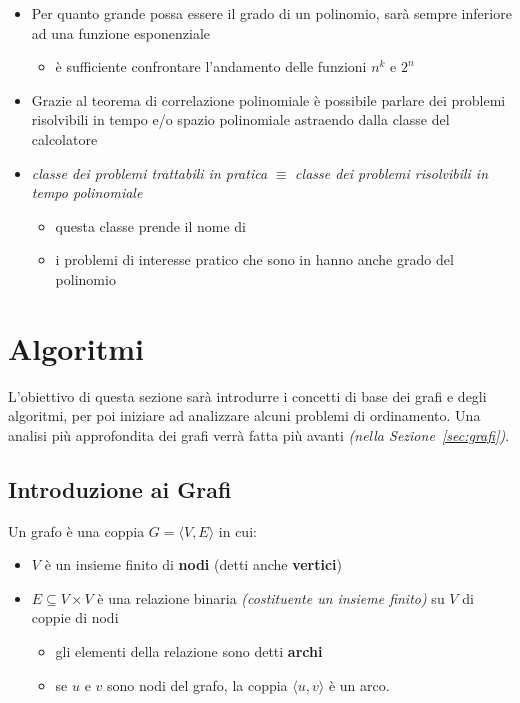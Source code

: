 \documentclass[italian, 10pt]{article}
\begin{document}
\begin{itemize}
  \item Per quanto grande possa essere il grado di un polinomio, sarà sempre inferiore ad una funzione esponenziale
        \begin{itemize}[label=\(\rightarrow\)]
          \item è sufficiente confrontare l'andamento delle funzioni \(n^k\) e \(2^n\)
        \end{itemize}
  \item Grazie al teorema di correlazione polinomiale è possibile parlare dei problemi risolvibili in tempo e/o spazio polinomiale astraendo dalla classe del calcolatore
  \item \textit{classe dei problemi trattabili in pratica} \(\equiv\) \textit{classe dei problemi risolvibili in tempo polinomiale}
        \begin{itemize}
          \item questa classe prende il nome di \Pset
          \item i problemi di interesse pratico che sono in \Pset hanno anche grado del polinomio 
        \end{itemize}
\end{itemize}

\clearpage

\section{Algoritmi}

L'obiettivo di questa sezione sarà introdurre i concetti di base dei grafi e degli algoritmi, per poi iniziare ad analizzare alcuni problemi di ordinamento.
Una analisi più approfondita dei grafi verrà fatta più avanti \textit{(nella Sezione~\ref{sec:grafi})}.

\subsection{Introduzione ai Grafi}
\label{sec:introduzione-grafi}

Un grafo è una coppia \(G = \langle V, E \rangle\) in cui:

\begin{itemize}
  \item \(V\) è un insieme finito di \textbf{nodi} (detti anche \textbf{vertici})
  \item \(E \subseteq V \times V\) è una relazione binaria \textit{(costituente un insieme finito)} su \(V\) di coppie di nodi
        \begin{itemize}
          \item gli elementi della relazione sono detti \textbf{archi}
          \item se \(u\) e \(v\) sono nodi del grafo, la coppia \(\langle u, v \rangle\) è un arco.
        \end{itemize}
\end{itemize}
\end{document}
